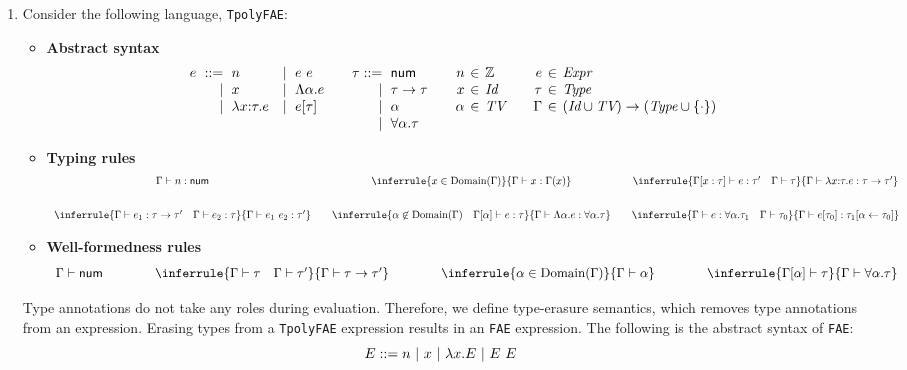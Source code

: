 \begin{enumerate}
\item
Consider the following language, \texttt{TpolyFAE}:
\begin{itemize}
  \item[]\textbf{Abstract syntax}
\[
\begin{array}{r@{\hskip6pt}r@{\hskip6pt}l
  r@{\hskip6pt}l@{\hskip20pt}
  r@{\hskip6pt}l@{\hskip20pt}
  r@{\hskip4pt}c@{\hskip4pt}l@{\hskip20pt}
  r@{\hskip4pt}c@{\hskip4pt}l}
  e &::= & n &|& e\ e & \tau::= & \textsf{num} & n &\in& \mathbb{Z}& e &\in& \emph{Expr} \\
  &|& x &|& \Lambda\alpha.e &|&\tau\rightarrow\tau & x &\in& \emph{Id}& \tau &\in& \emph{Type} \\
  &|& \lambda x{:}\tau.e &|& e[\tau] &|&\alpha & \alpha &\in& \emph{TV}&
  \Gamma &\in& (\emph{Id}\cup\emph{TV})\rightarrow(\emph{Type}\cup\{\cdot\}) \\
  &&&&&|&\forall\alpha.\tau \\
\end{array}
\]
  \item[]\textbf{Typing rules}
\[
\begin{array}{c@{\hskip20pt}c@{\hskip20pt}c}
\Gamma\vdash n:\textsf{num}
  &
  \inferrule
  { x\in\Dom{\Gamma} }
  { \Gamma\vdash x:\Gamma(x) }
  &
  \inferrule
  { \Gamma[x:\tau]\vdash e:\tau' \rulesep \Gamma\vdash\tau }
  { \Gamma\vdash \lambda x{:}\tau.e:\tau\rightarrow\tau' }
  \\[20pt]
  \inferrule
  { \Gamma\vdash e_1:\tau\rightarrow\tau' \rulesep
    \Gamma\vdash e_2:\tau }
  { \Gamma\vdash e_1\ e_2:\tau' }
  &
  \inferrule
  {
    \alpha\not\in\Dom{\Gamma} \rulesep
    \Gamma[\alpha]\vdash e:\tau
  }
  { \Gamma\vdash \Lambda\alpha.e:\forall\alpha.\tau }
  &
  \inferrule
  {
    \Gamma\vdash e:\forall\alpha.\tau_1 \rulesep
    \Gamma\vdash\tau_0
  }
  { \Gamma\vdash e[\tau_0]:\tau_1[\alpha\leftarrow\tau_0] }
\end{array}
\]
  \item[]\textbf{Well-formedness rules}
\[
\begin{array}{c@{\hskip40pt}c@{\hskip40pt}c@{\hskip40pt}c}
  \Gamma\vdash\textsf{num}
  &
  \inferrule
  { \Gamma\vdash\tau \rulesep \Gamma\vdash\tau' }
  { \Gamma\vdash\tau\rightarrow\tau' }
  &
  \inferrule
  { \alpha\in\Dom{\Gamma} }
  { \Gamma\vdash\alpha }
  &
  \inferrule
  { \Gamma[\alpha]\vdash\tau }
  { \Gamma\vdash\forall\alpha.\tau }
\end{array}
\]
\end{itemize}

Type annotations do not take any roles during evaluation.
Therefore, we define type-erasure semantics, which removes
type annotations from an expression.
Erasing types from a \texttt{TpolyFAE} expression results
in an \texttt{FAE} expression. The following is the abstract syntax of \texttt{FAE}:
\[
  E::= n \ |\ x\ |\ \lambda x.E\ |\ E\ E \\
\]


\end{enumerate}
